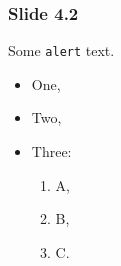 \documentclass{beamer}
\begin{document}
\begin{frame}[fragile]
    \frametitle{Slide 4.2}

    \alert{Some \texttt{alert} text.}

    \begin{itemize}
        \item One,
        \item Two,
        \item Three:
        \begin{enumerate}
            \item A,
            \item B,
            \item C.
        \end{enumerate}
    \end{itemize}
\end{frame}
\end{document}
